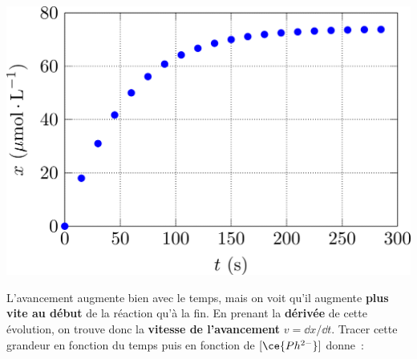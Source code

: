 \documentclass[../../main/main.tex]{subfiles}
\begin{document}

\begin{center}
	\includegraphics[width=.5\linewidth]{ph_evol-c}
\end{center}

L'avancement augmente bien avec le temps, mais on voit qu'il augmente
\textbf{plus vite au début} de la réaction qu'à la fin. En prenant la
\textbf{dérivée} de cette évolution, on trouve donc la \textbf{vitesse de
	l'avancement} $v = \dd x/\dd t$. Tracer cette grandeur en fonction du temps puis
en fonction de $[\ce{Ph^{2-}}]$ donne~:
\end{document}
